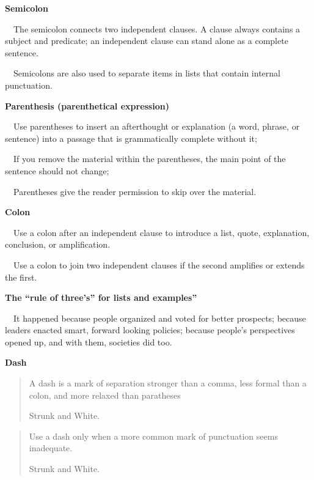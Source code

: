 \documentclass[a4paper, 12pt]{article}
\begin{document}
\textbf{Semicolon}
\par\ \textbullet\ The semicolon connects two independent clauses. A clause always contains a subject and predicate; an independent clause can stand alone as a complete sentence.
\par\ \textbullet\ Semicolons are also used to separate items in lists that contain internal punctuation.

\textbf{Parenthesis (parenthetical expression)}
\par\ \textbullet\ Use parentheses to insert an afterthought or explanation (a word, phrase, or sentence) into a passage that is grammatically complete without it;
\par\ \textbullet\ If you remove the material within the parentheses, the main point of the sentence should not change;
\par\ \textbullet\ Parentheses give the reader permission to skip over the material.

\textbf{Colon}
\par\ \textbullet\ Use a colon after an independent clause to introduce a list, quote, explanation, conclusion, or amplification.
\par\ \textbullet\ Use a colon to join two independent clauses if the second amplifies or extends the first.

\textbf{The ``rule of three's'' for lists and examples''}
\par\ \textbullet\ It happened because people organized and voted for better prospects; because leaders enacted smart, forward looking policies; because people's perspectives opened up, and with them, societies did too.

\newpage\textbf{Dash}

\vspace{4pt}\begin{quote}
    A dash is a mark of separation stronger than a comma, less formal than a colon, and more relaxed than paratheses
\begin{flushright}
Strunk and White.
\end{flushright}
\end{quote}

\vspace{4pt}\begin{quote}
    Use a dash only when a more common mark of punctuation seems inadequate.
\begin{flushright}
Strunk and White.
\end{flushright}
\end{quote}
\end{document}
